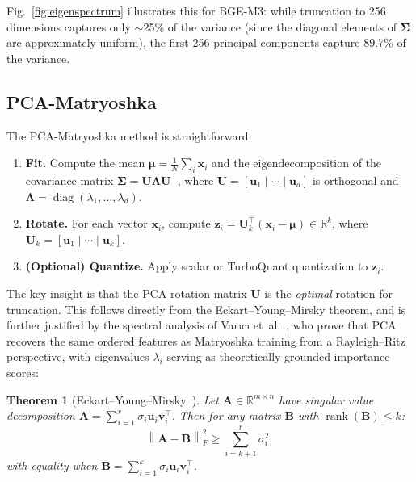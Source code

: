 \documentclass[journal]{IEEEtran}
\newtheorem{theorem}{Theorem}
\newcommand{\R}{\mathbb{R}}
\newcommand{\norm}[1]{\left\lVert #1 \right\rVert}
\newcommand{\rank}{\operatorname{rank}}
\begin{document}
Fig.~\ref{fig:eigenspectrum} illustrates this for BGE-M3: while truncation to 256 dimensions captures only $\sim$25\% of the variance (since the diagonal elements of $\mathbf{\Sigma}$ are approximately uniform), the first 256 principal components capture 89.7\% of the variance.

\subsection{PCA-Matryoshka}

The PCA-Matryoshka method is straightforward:

\begin{enumerate}
  \item \textbf{Fit.} Compute the mean $\boldsymbol{\mu} = \frac{1}{N}\sum_i \mathbf{x}_i$ and the eigendecomposition of the covariance matrix $\mathbf{\Sigma} = \mathbf{U} \boldsymbol{\Lambda} \mathbf{U}^\top$, where $\mathbf{U} = [\mathbf{u}_1 \mid \cdots \mid \mathbf{u}_d]$ is orthogonal and $\boldsymbol{\Lambda} = \operatorname{diag}(\lambda_1, \ldots, \lambda_d)$.
  \item \textbf{Rotate.} For each vector $\mathbf{x}_i$, compute $\mathbf{z}_i = \mathbf{U}_k^\top (\mathbf{x}_i - \boldsymbol{\mu}) \in \R^k$, where $\mathbf{U}_k = [\mathbf{u}_1 \mid \cdots \mid \mathbf{u}_k]$.
  \item \textbf{(Optional) Quantize.} Apply scalar or TurboQuant quantization to $\mathbf{z}_i$.
\end{enumerate}

The key insight is that the PCA rotation matrix $\mathbf{U}$ is the \emph{optimal} rotation for truncation.
This follows directly from the Eckart--Young--Mirsky theorem, and is further justified by the spectral analysis of Var{\i}c{\i} et~al.~\cite{varici2025eigenfunction}, who prove that PCA recovers the same ordered features as Matryoshka training from a Rayleigh--Ritz perspective, with eigenvalues $\lambda_i$ serving as theoretically grounded importance scores:

\begin{theorem}[Eckart--Young--Mirsky~\cite{eckart1936approximation}]
Let $\mathbf{A} \in \R^{m \times n}$ have singular value decomposition $\mathbf{A} = \sum_{i=1}^{r} \sigma_i \mathbf{u}_i \mathbf{v}_i^\top$.
Then for any matrix $\mathbf{B}$ with $\rank(\mathbf{B}) \leq k$:
\begin{equation}
  \norm{\mathbf{A} - \mathbf{B}}_F^2 \geq \sum_{i=k+1}^{r} \sigma_i^2,
  \label{eq:eckart_young}
\end{equation}
with equality when $\mathbf{B} = \sum_{i=1}^{k} \sigma_i \mathbf{u}_i \mathbf{v}_i^\top$.
\end{theorem}
\end{document}
